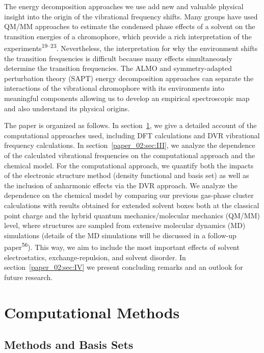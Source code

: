 The energy decomposition approaches we use add new and valuable physical insight into the origin of the vibrational frequency shifts. Many groups have used QM/MM approaches to estimate the condensed phase effects of a solvent on the transition energies of a chromophore, which provide a rich interpretation of the experiments\textsuperscript{19--23}. Nevertheless, the interpretation for why the environment shifts the transition frequencies is difficult because many effects simultaneously determine the transition frequencies. The ALMO and symmetry-adapted perturbation theory (SAPT) energy decomposition approaches can separate the interactions of the vibrational chromophore with its environments into meaningful components allowing us to develop an empirical spectroscopic map and also understand its physical origins.

The paper is organized as follows. In section~\ref{paper_02:sec:II}, we give a detailed account of the computational approaches used, including DFT calculations and DVR vibrational frequency calculations. In section~\ref{paper_02:sec:III}, we analyze the dependence of the calculated  vibrational frequencies on the computational approach and the chemical model. For the computational approach, we quantify both the impacts of the electronic structure method (density functional and basis set) as well as the inclusion of anharmonic effects via the DVR approach. We analyze the dependence on the chemical model by comparing our previous gas-phase cluster calculations with results obtained for extended solvent boxes both at the classical point charge and the hybrid quantum mechanics/molecular mechanics (QM/MM) level, where structures are sampled from extensive molecular dynamics (MD) simulations (details of the MD simulations will be discussed in a follow-up paper\textsuperscript{56}). This way, we aim to include the most important effects of solvent electrostatics, exchange-repulsion, and solvent disorder. In section~\ref{paper_02:sec:IV} we present concluding remarks and an outlook for future research.

\section{Computational Methods}
\label{paper_02:sec:II}

\subsection{Methods and Basis Sets}
\label{paper_02:ssec:IIA}

